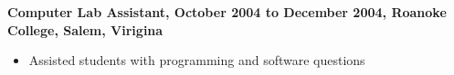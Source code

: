 \documentclass[10pt]{res}
\begin{document}
\begin{resume}
\begin{flushleft}
{\bf Computer Lab Assistant, October 2004 to December 2004, Roanoke College, Salem, Virigina}
\end{flushleft}

\begin{itemize}
\setlength{\itemsep}{1pt}
\setlength{\parskip}{0pt}
\setlength{\parsep}{0pt}
\item Assisted students with programming and software questions
\end{itemize}







\end{resume}
\end{document}
